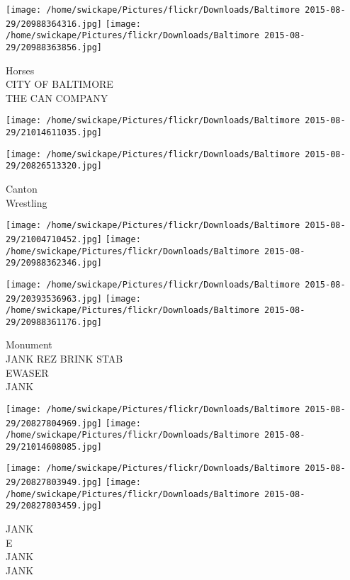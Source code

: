 \documentclass[10pt,letterpaper]{article}
\begin{document}
\vspace{0.25in}
\texttt{[image: /home/swickape/Pictures/flickr/Downloads/Baltimore 2015-08-29/20988364316.jpg]}
\texttt{[image: /home/swickape/Pictures/flickr/Downloads/Baltimore 2015-08-29/20988363856.jpg]}

Horses\\
CITY OF BALTIMORE\\
THE CAN COMPANY\\
\pagebreak

\texttt{[image: /home/swickape/Pictures/flickr/Downloads/Baltimore 2015-08-29/21014611035.jpg]}

\vspace{0.25in}
\texttt{[image: /home/swickape/Pictures/flickr/Downloads/Baltimore 2015-08-29/20826513320.jpg]}

Canton\\
Wrestling\\
\pagebreak

\texttt{[image: /home/swickape/Pictures/flickr/Downloads/Baltimore 2015-08-29/21004710452.jpg]}
\texttt{[image: /home/swickape/Pictures/flickr/Downloads/Baltimore 2015-08-29/20988362346.jpg]}

\texttt{[image: /home/swickape/Pictures/flickr/Downloads/Baltimore 2015-08-29/20393536963.jpg]}
\texttt{[image: /home/swickape/Pictures/flickr/Downloads/Baltimore 2015-08-29/20988361176.jpg]}

Monument\\
JANK REZ BRINK STAB\\
EWASER\\
JANK\\
\pagebreak

\texttt{[image: /home/swickape/Pictures/flickr/Downloads/Baltimore 2015-08-29/20827804969.jpg]}
\texttt{[image: /home/swickape/Pictures/flickr/Downloads/Baltimore 2015-08-29/21014608085.jpg]}

\texttt{[image: /home/swickape/Pictures/flickr/Downloads/Baltimore 2015-08-29/20827803949.jpg]}
\texttt{[image: /home/swickape/Pictures/flickr/Downloads/Baltimore 2015-08-29/20827803459.jpg]}

JANK\\
E\\
JANK\\
JANK\\
\pagebreak
\end{document}
